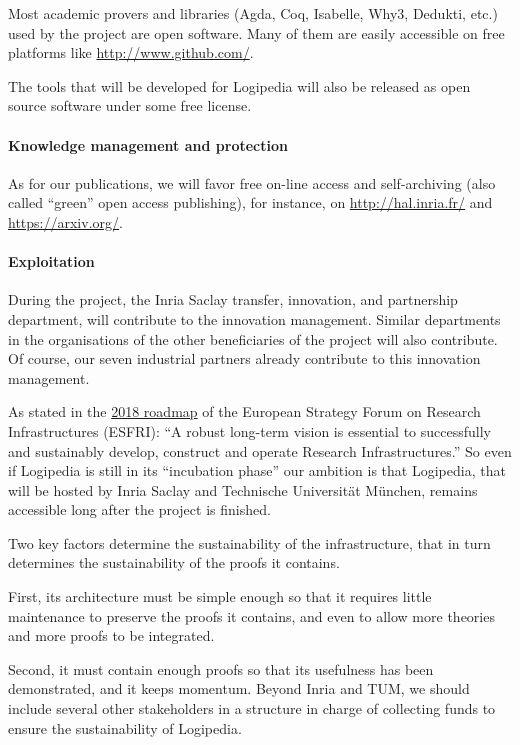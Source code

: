 Most academic provers and libraries (Agda, Coq, Isabelle, Why3,
Dedukti, etc.) used by the project are open software. Many of them are
easily accessible on free platforms like \url{http://www.github.com/}.

The tools that will be developed for Logipedia will also be released
as open source software under some free license.

\paragraph*{Knowledge management and protection}

As for our publications, we will favor free on-line access and
self-archiving (also called ``green'' open access publishing), for
instance, on \url{http://hal.inria.fr/} and \url{https://arxiv.org/}.

\paragraph*{Exploitation}

During the project, the Inria Saclay transfer, innovation, and
partnership department, will contribute to the innovation management.
Similar departments in the organisations of the other beneficiaries of
the project will also contribute. Of course, our seven industrial
partners already contribute to this innovation management.

As stated in the
\href{http://roadmap2018.esfri.eu/media/1048/rm2018-part1-20.pdf}{2018
  roadmap} of the European Strategy Forum on Research Infrastructures
(ESFRI): ``A robust long-term vision is essential to successfully and
sustainably develop, construct and operate Research Infrastructures.''
So even if Logipedia is still in its ``incubation phase'' our ambition
is that Logipedia, that will be hosted by Inria Saclay and Technische
Universität München, remains accessible long after the project is
finished.

Two key factors determine the sustainability of the infrastructure,
that in turn determines the sustainability of the proofs it contains.
\begin{compactitem}
\item First, its architecture must be simple enough so that it
  requires little maintenance to preserve the proofs it contains, and
  even to allow more theories and more proofs to be integrated.
\item Second, it must contain enough proofs so that its usefulness has
  been demonstrated, and it keeps momentum. Beyond Inria and TUM, we
  should include several other stakeholders in a structure in charge of
  collecting funds to ensure the sustainability of Logipedia.
\end{compactitem}

